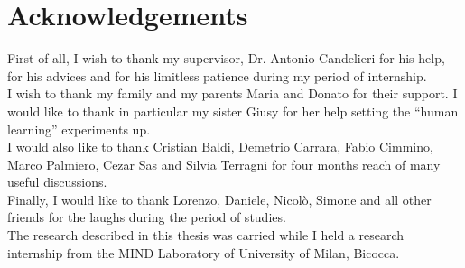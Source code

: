\chapter*{Acknowledgements}
\pagestyle{empty}

First of all, I wish to thank my supervisor, Dr. Antonio Candelieri for his help, for his advices and for his limitless patience during my period of internship. \\

I wish to thank my family and my parents Maria and Donato for their support. I would like to thank in particular my sister Giusy for her help setting the \enquote{human learning} experiments up. \\

I would also like to thank Cristian Baldi, Demetrio Carrara, Fabio Cimmino, Marco Palmiero, Cezar Sas and Silvia Terragni for four months reach of many useful discussions. \\

Finally, I would like to thank Lorenzo, Daniele, Nicolò, Simone  and all other friends for the laughs during the period of studies. \\

The research described in this thesis was carried while I held a research internship from the MIND Laboratory of University of Milan, Bicocca. \\

